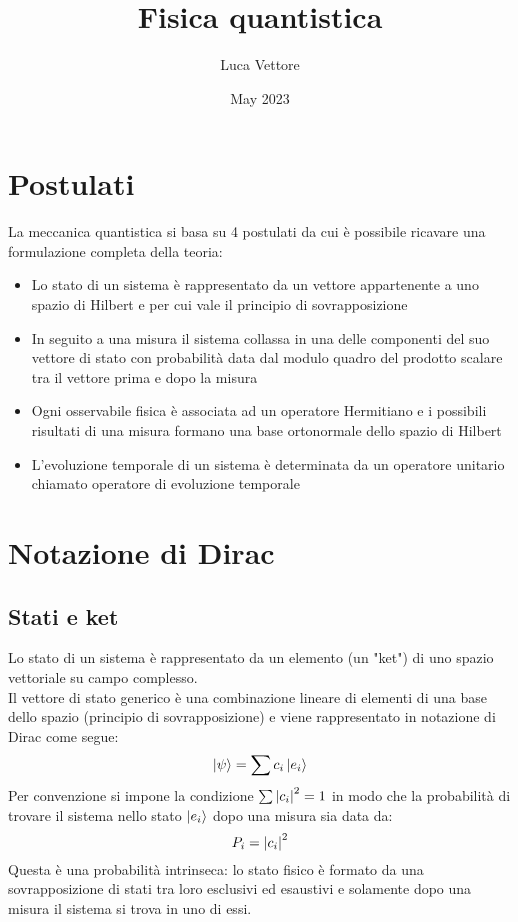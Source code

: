 \documentclass{article}
\title{Fisica quantistica}
\author{Luca Vettore}
\date{May 2023}
\begin{document}


\maketitle

\section{Postulati}
La meccanica quantistica si basa su 4 postulati da cui è possibile ricavare una formulazione completa della teoria:
\begin{itemize}
    \item Lo stato di un sistema è rappresentato da un vettore appartenente a uno spazio di Hilbert e per cui vale il principio di sovrapposizione

    \item In seguito a una misura il sistema collassa in una delle componenti del suo vettore di stato con probabilità data dal modulo quadro del prodotto scalare tra il vettore prima e dopo la misura

    \item Ogni osservabile fisica è associata ad un operatore Hermitiano e i possibili risultati di una misura formano una base ortonormale dello spazio di Hilbert

    \item L'evoluzione temporale di un sistema è determinata da un operatore unitario chiamato operatore di evoluzione temporale
    
\end{itemize}

\section{Notazione di Dirac}
\subsection{Stati e ket}
Lo stato di un sistema è rappresentato da un elemento (un "ket") di uno spazio vettoriale su campo complesso.\\
Il vettore di stato generico è una combinazione lineare di elementi di una base dello spazio (principio di sovrapposizione) e viene rappresentato in notazione di Dirac come segue:
$$ \ket{\psi} =  \sum c_i\ket{e_i} $$
Per convenzione si impone la condizione $\sum \abs{c_i}^2=1$ in modo che la probabilità di trovare il sistema nello stato $\ket{e_i}$ dopo una misura sia data da:
$$ P_i=\abs{c_i}^2 $$
Questa è una probabilità intrinseca: lo stato fisico è formato da una sovrapposizione di stati tra loro esclusivi ed esaustivi e solamente dopo una misura il sistema si trova in uno di essi.
\end{document}
